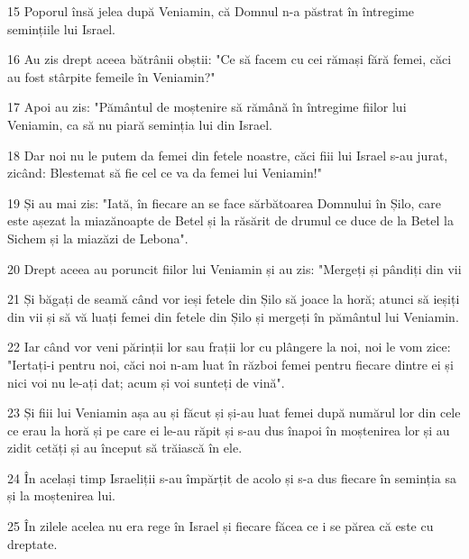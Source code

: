 \par 15 Poporul însă jelea după Veniamin, că Domnul n-a păstrat în întregime semințiile lui Israel.
\par 16 Au zis drept aceea bătrânii obștii: "Ce să facem cu cei rămași fără femei, căci au fost stârpite femeile în Veniamin?"
\par 17 Apoi au zis: "Pământul de moștenire să rămână în întregime fiilor lui Veniamin, ca să nu piară seminția lui din Israel.
\par 18 Dar noi nu le putem da femei din fetele noastre, căci fiii lui Israel s-au jurat, zicând: Blestemat să fie cel ce va da femei lui Veniamin!"
\par 19 Și au mai zis: "Iată, în fiecare an se face sărbătoarea Domnului în Șilo, care este așezat la miazănoapte de Betel și la răsărit de drumul ce duce de la Betel la Sichem și la miazăzi de Lebona".
\par 20 Drept aceea au poruncit fiilor lui Veniamin și au zis: "Mergeți și pândiți din vii
\par 21 Și băgați de seamă când vor ieși fetele din Șilo să joace la horă; atunci să ieșiți din vii și să vă luați femei din fetele din Șilo și mergeți în pământul lui Veniamin.
\par 22 Iar când vor veni părinții lor sau frații lor cu plângere la noi, noi le vom zice: "Iertați-i pentru noi, căci noi n-am luat în război femei pentru fiecare dintre ei și nici voi nu le-ați dat; acum și voi sunteți de vină".
\par 23 Și fiii lui Veniamin așa au și făcut și și-au luat femei după numărul lor din cele ce erau la horă și pe care ei le-au răpit și s-au dus înapoi în moștenirea lor și au zidit cetăți și au început să trăiască în ele.
\par 24 În același timp Israeliții s-au împărțit de acolo și s-a dus fiecare în seminția sa și la moștenirea lui.
\par 25 În zilele acelea nu era rege în Israel și fiecare făcea ce i se părea că este cu dreptate.


